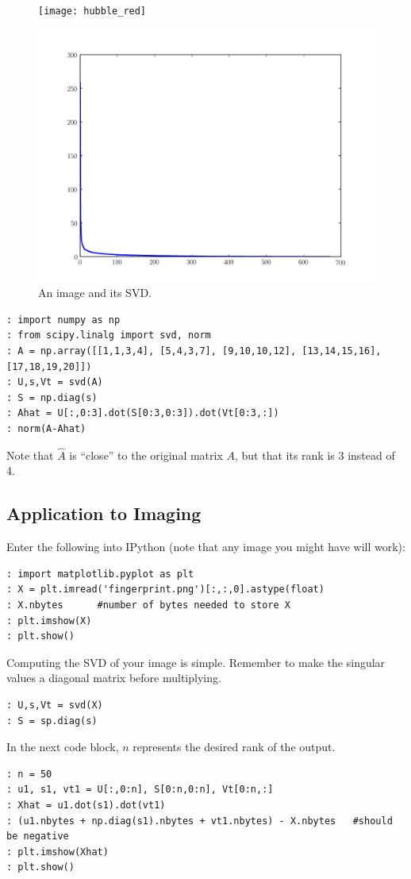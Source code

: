 \begin{figure}
\begin{minipage}[b]{.4\linewidth}
\centering
\texttt{[image: hubble\_red]}
\end{minipage}
\hspace{0.5cm}
\begin{minipage}[b]{0.5\linewidth}
\centering
\includegraphics[width=\textwidth]{hubble_svals}
\end{minipage}
\caption{An image and its SVD.}
\end{figure}

\begin{lstlisting}
: import numpy as np
: from scipy.linalg import svd, norm
: A = np.array([[1,1,3,4], [5,4,3,7], [9,10,10,12], [13,14,15,16], [17,18,19,20]])
: U,s,Vt = svd(A)
: S = np.diag(s)
: Ahat = U[:,0:3].dot(S[0:3,0:3]).dot(Vt[0:3,:])
: norm(A-Ahat)
\end{lstlisting}
Note that $\widehat A$ is ``close'' to the original matrix $A$, but that its rank is 3 instead of 4.

\subsection*{Application to Imaging}
Enter the following into IPython (note that any image you might have will work):
\begin{lstlisting}
: import matplotlib.pyplot as plt
: X = plt.imread('fingerprint.png')[:,:,0].astype(float)
: X.nbytes      #number of bytes needed to store X
: plt.imshow(X)
: plt.show()
\end{lstlisting}
Computing the SVD of your image is simple.
Remember to make the singular values a diagonal matrix before multiplying.
\begin{lstlisting}
: U,s,Vt = svd(X)
: S = sp.diag(s)
\end{lstlisting}
In the next code block, $n$ represents the desired rank of the output.
\begin{lstlisting}
: n = 50
: u1, s1, vt1 = U[:,0:n], S[0:n,0:n], Vt[0:n,:]
: Xhat = u1.dot(s1).dot(vt1)
: (u1.nbytes + np.diag(s1).nbytes + vt1.nbytes) - X.nbytes   #should be negative
: plt.imshow(Xhat)
: plt.show()
\end{lstlisting}

